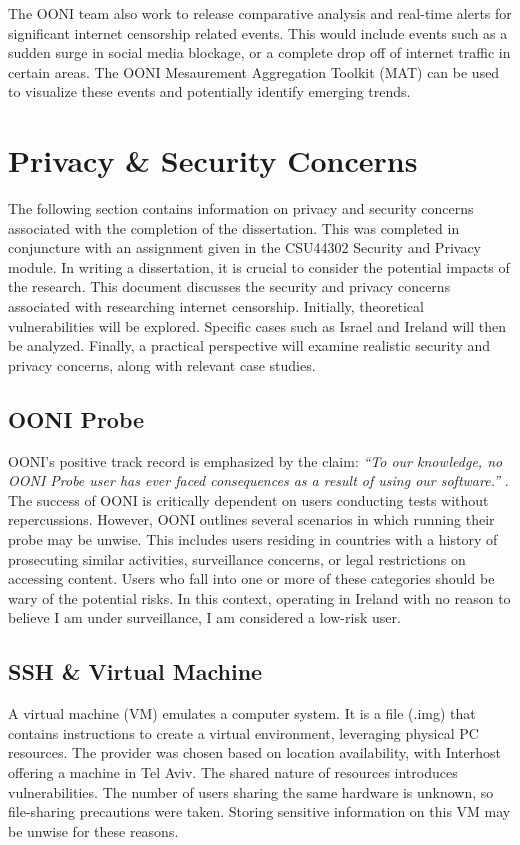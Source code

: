 The OONI team also work to release comparative analysis and real-time alerts for significant internet censorship related events. This would include events such as a sudden surge in social media blockage, or a complete drop off of internet traffic in certain areas. The OONI Mesaurement Aggregation Toolkit (MAT) can be used to visualize these events and potentially identify emerging trends. 

\section{Privacy \& Security Concerns}
The following section contains information on privacy and security concerns associated with the completion of the dissertation. This was completed in conjuncture with an assignment given in the CSU44302 Security and Privacy module. 
In writing a dissertation, it is crucial to consider the potential impacts of the research. This document discusses the security and privacy concerns associated with researching internet censorship. Initially, theoretical vulnerabilities will be explored. Specific cases such as Israel and Ireland will then be analyzed. Finally, a practical perspective will examine realistic security and privacy concerns, along with relevant case studies.

\subsection{OONI Probe}
OONI's positive track record is emphasized by the claim: \textit{“To our knowledge, no OONI Probe user has ever faced consequences as a result of using our software.”} \cite{OONIRisks}. The success of OONI is critically dependent on users conducting tests without repercussions. However, OONI outlines several scenarios in which running their probe may be unwise. This includes users residing in countries with a history of prosecuting similar activities, surveillance concerns, or legal restrictions on accessing content. Users who fall into one or more of these categories should be wary of the potential risks. In this context, operating in Ireland with no reason to believe I am under surveillance, I am considered a low-risk user.

\subsection{SSH \& Virtual Machine}
A virtual machine (VM) emulates a computer system. It is a file (.img) that contains instructions to create a virtual environment, leveraging physical PC resources. The provider was chosen based on location availability, with Interhost offering a machine in Tel Aviv. The shared nature of resources introduces vulnerabilities. The number of users sharing the same hardware is unknown, so file-sharing precautions were taken. Storing sensitive information on this VM may be unwise for these reasons.

